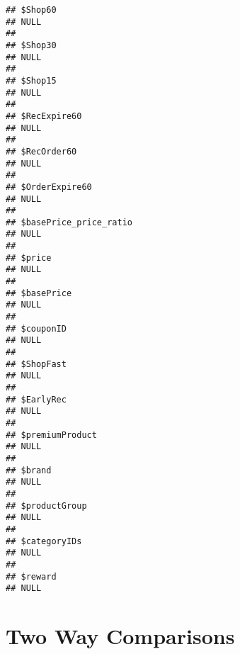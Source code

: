 \documentclass[10pt]{report}
\newenvironment{Shaded}{}{}
\newcommand{\KeywordTok}[1]{\textcolor[rgb]{0.00,0.44,0.13}{\textbf{{#1}}}}
\newcommand{\DecValTok}[1]{\textcolor[rgb]{0.25,0.63,0.44}{{#1}}}
\newcommand{\StringTok}[1]{\textcolor[rgb]{0.25,0.44,0.63}{{#1}}}
\newcommand{\NormalTok}[1]{{#1}}
\begin{document}
\begin{verbatim}
## $Shop60
## NULL
## 
## $Shop30
## NULL
## 
## $Shop15
## NULL
## 
## $RecExpire60
## NULL
## 
## $RecOrder60
## NULL
## 
## $OrderExpire60
## NULL
## 
## $basePrice_price_ratio
## NULL
## 
## $price
## NULL
## 
## $basePrice
## NULL
## 
## $couponID
## NULL
## 
## $ShopFast
## NULL
## 
## $EarlyRec
## NULL
## 
## $premiumProduct
## NULL
## 
## $brand
## NULL
## 
## $productGroup
## NULL
## 
## $categoryIDs
## NULL
## 
## $reward
## NULL
\end{verbatim}

\section{Two Way Comparisons}\label{two-way-comparisons}

\begin{Shaded}
\end{Shaded}
\end{document}

